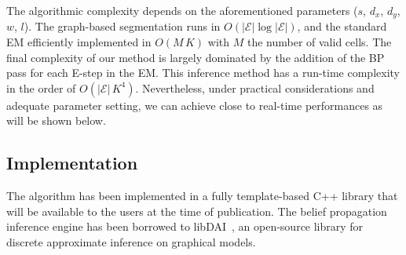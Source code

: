 The algorithmic complexity depends on the aforementioned parameters ($s$, $d_x$,
$d_y$, $w$, $l$). The graph-based segmentation runs in
$O(|\mathcal{E}|\log|\mathcal{E}|)$, and the standard EM efficiently implemented
in $O(M\,K)$ with $M$ the number of valid cells. The final complexity of our
method is largely dominated by the addition of the BP pass for each E-step in
the EM. This inference method has a run-time complexity in the order of
$O(|\mathcal{E}|\,K^4)$. Nevertheless, under practical considerations and
adequate parameter setting, we can achieve close to real-time performances as
will be shown below.

\subsection{Implementation}

The algorithm has been implemented in a fully template-based C++ library that
will be available to the users at the time of publication. The belief
propagation inference engine has been borrowed to libDAI~\cite{mooij10libdai},
an open-source library for discrete approximate inference on graphical models.
